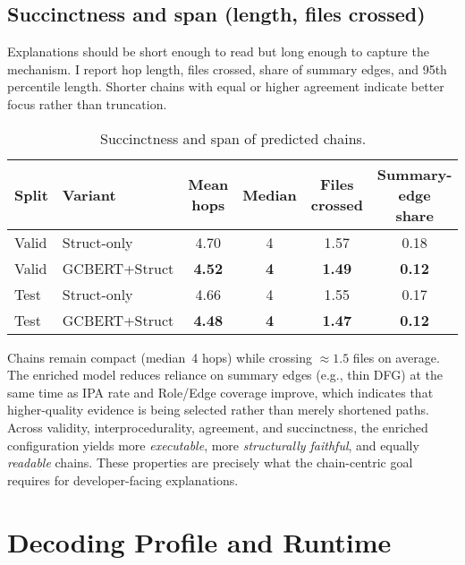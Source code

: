 \documentclass{buthesis}
\begin{document}
\subsection{Succinctness and span (length, files crossed)}
\label{sec:results-succinct}

Explanations should be short enough to read but long enough to capture the mechanism. I report hop length, files crossed, share of summary edges, and 95th percentile length. Shorter chains with equal or higher agreement indicate better focus rather than truncation.

\begin{table}[H]
\centering
\small
\setlength{\tabcolsep}{8pt}
\renewcommand{\arraystretch}{1.10}
\caption{Succinctness and span of predicted chains.}
\label{tab:succinct}
\begin{tabular}{l l c c c c}
\toprule
\textbf{Split} & \textbf{Variant} & \textbf{Mean hops} & \textbf{Median} & \textbf{Files crossed} & \textbf{Summary-edge share} \\
\midrule
Valid & Struct-only        & 4.70 & 4 & 1.57 & 0.18 \\
Valid & GCBERT{+}Struct   & \textbf{4.52} & \textbf{4} & \textbf{1.49} & \textbf{0.12} \\
Test  & Struct-only        & 4.66 & 4 & 1.55 & 0.17 \\
Test  & GCBERT{+}Struct   & \textbf{4.48} & \textbf{4} & \textbf{1.47} & \textbf{0.12} \\
\bottomrule
\end{tabular}
\end{table}

\noindent
Chains remain compact (median~4 hops) while crossing $\approx1.5$ files on average. The enriched model reduces reliance on summary edges (e.g., thin DFG) at the same time as IPA rate and Role/Edge coverage improve, which indicates that higher-quality evidence is being selected rather than merely shortened paths. Across validity, interprocedurality, agreement, and succinctness, the enriched configuration yields more \emph{executable}, more \emph{structurally faithful}, and equally \emph{readable} chains. These properties are precisely what the chain-centric goal requires for developer-facing explanations.








\section{Decoding Profile and Runtime}
\label{sec:results-decoding}
\end{document}
